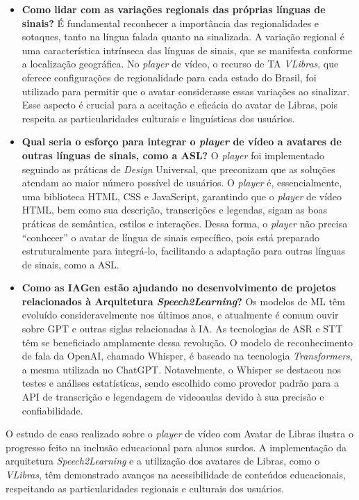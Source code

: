 \begin{itemize}
    \item \textbf{Como lidar com as variações regionais das próprias línguas de sinais?} 
    É fundamental reconhecer a importância das regionalidades e sotaques, tanto na língua falada quanto na sinalizada. A variação regional é uma característica intrínseca das línguas de sinais, que se manifesta conforme a localização geográfica. No \textit{player} de vídeo, o recurso de TA \textit{VLibras}, que oferece configurações de regionalidade para cada estado do Brasil, foi utilizado para permitir que o avatar considerasse essas variações ao sinalizar. Esse aspecto é crucial para a aceitação e eficácia do avatar de Libras, pois respeita as particularidades culturais e linguísticas dos usuários.
    
    \item \textbf{Qual seria o esforço para integrar o \textit{player} de vídeo a avatares de outras línguas de sinais, como a ASL?} 
    O \textit{player} foi implementado seguindo as práticas de \textit{Design} Universal, que preconizam que as soluções atendam ao maior número possível de usuários. O \textit{player} é, essencialmente, uma biblioteca HTML, CSS e JavaScript, garantindo que o \textit{player} de vídeo HTML, bem como sua descrição, transcrições e legendas, sigam as boas práticas de semântica, estilos e interações. Dessa forma, o \textit{player} não precisa ``conhecer'' o avatar de língua de sinais específico, pois está preparado estruturalmente para integrá-lo, facilitando a adaptação para outras línguas de sinais, como a ASL.
    
    \item \textbf{Como as IAGen estão ajudando no desenvolvimento de projetos relacionados à Arquitetura \textit{Speech2Learning}?} 
    Os modelos de ML têm evoluído consideravelmente nos últimos anos, e atualmente é comum ouvir sobre GPT e outras siglas relacionadas à IA. As tecnologias de ASR e STT têm se beneficiado amplamente dessa revolução. O modelo de reconhecimento de fala da OpenAI, chamado Whisper, é baseado na tecnologia \textit{Transformers}, a mesma utilizada no ChatGPT. Notavelmente, o Whisper se destacou nos testes e análises estatísticas, sendo escolhido como provedor padrão para a API de transcrição e legendagem de videoaulas devido à sua precisão e confiabilidade.
\end{itemize}

O estudo de caso realizado sobre o \textit{player} de vídeo com Avatar de Libras ilustra o progresso feito na inclusão educacional para alunos surdos. A implementação da arquitetura \textit{Speech2Learning} e a utilização dos avatares de Libras, como o \textit{VLibras}, têm demonstrado avanços na acessibilidade de conteúdos educacionais, respeitando as particularidades regionais e culturais dos usuários. %

